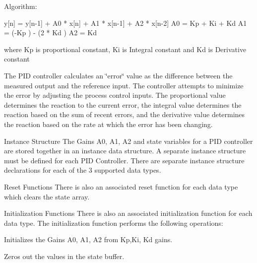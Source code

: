\begin{DoxyParagraph}{Algorithm\-:}

\begin{DoxyPre}
   y[n] = y[n-1] + A0 * x[n] + A1 * x[n-1] + A2 * x[n-2]
   A0 = Kp + Ki + Kd
   A1 = (-Kp ) - (2 * Kd )
   A2 = Kd  \end{DoxyPre}

\end{DoxyParagraph}
\begin{DoxyParagraph}{}
where {\ttfamily Kp} is proportional constant, {\ttfamily Ki} is Integral constant and {\ttfamily Kd} is Derivative constant
\end{DoxyParagraph}
\begin{DoxyParagraph}{}

\end{DoxyParagraph}
\begin{DoxyParagraph}{}
The P\-I\-D controller calculates an \char`\"{}error\char`\"{} value as the difference between the measured output and the reference input. The controller attempts to minimize the error by adjusting the process control inputs. The proportional value determines the reaction to the current error, the integral value determines the reaction based on the sum of recent errors, and the derivative value determines the reaction based on the rate at which the error has been changing.
\end{DoxyParagraph}
\begin{DoxyParagraph}{Instance Structure }
The Gains A0, A1, A2 and state variables for a P\-I\-D controller are stored together in an instance data structure. A separate instance structure must be defined for each P\-I\-D Controller. There are separate instance structure declarations for each of the 3 supported data types.
\end{DoxyParagraph}
\begin{DoxyParagraph}{Reset Functions }
There is also an associated reset function for each data type which clears the state array.
\end{DoxyParagraph}
\begin{DoxyParagraph}{Initialization Functions }
There is also an associated initialization function for each data type. The initialization function performs the following operations\-:
\begin{DoxyItemize}
\item Initializes the Gains A0, A1, A2 from Kp,Ki, Kd gains.
\item Zeros out the values in the state buffer.
\end{DoxyItemize}
\end{DoxyParagraph}
